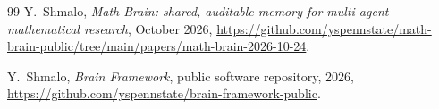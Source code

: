 \documentclass[11pt]{amsart}
\theoremstyle{remark}\newtheorem{remark}[theorem]{Remark}
\begin{document}
\begin{thebibliography}{99}
 Y.~Shmalo, \emph{Math Brain: shared, auditable memory for multi-agent mathematical research}, October 2026, \url{https://github.com/yspennstate/math-brain-public/tree/main/papers/math-brain-2026-10-24}.

 Y.~Shmalo, \emph{Brain Framework}, public software repository, 2026, \url{https://github.com/yspennstate/brain-framework-public}.

\end{thebibliography}
\end{document}
